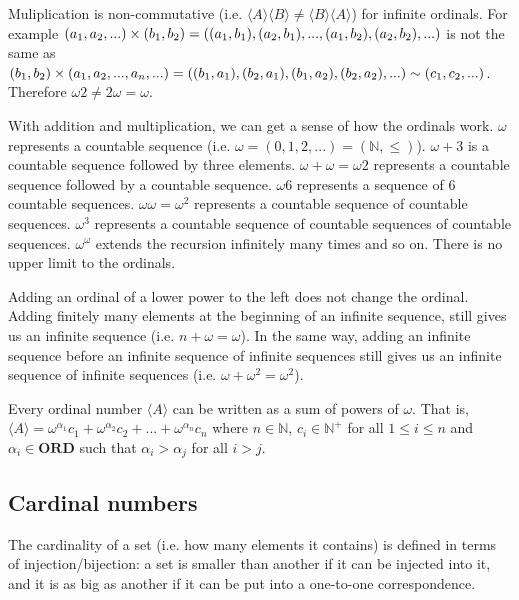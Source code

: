 \documentclass{article}
\def\ordinals{\textbf{ORD}}
\def\ordeq{\sim}
\begin{document}
\begin{remark}
	Muliplication is non-commutative (i.e. $\langle A \rangle \langle B \rangle \neq \langle B \rangle \langle A \rangle$) for infinite ordinals. For example $(a_1, a_2, ...) \times (b_1, b_2) = ((a_1, b_1), (a_2, b_1), ..., (a_1, b_2), (a_2, b_2), \\...)$ is not the same as $(b_1, b_2) \times (a_1, a_2, ..., a_n, ...) = ((b_1, a_1), (b_2, a_1), (b_1, a_2), \\ (b_2, a_2), ...) \ordeq (c_1, c_2, ...)$. Therefore $\omega 2 \neq 2 \omega = \omega$.
	
	With addition and multiplication, we can get a sense of how the ordinals work. $\omega$ represents a countable sequence (i.e. $\omega = (0, 1, 2, ...) = (\mathbb{N}, \leq)$). $\omega +3$ is a countable sequence followed by three elements. $\omega + \omega  = \omega2$ represents a countable sequence followed by a countable sequence. $\omega6$ represents a sequence of 6 countable sequences. $\omega\omega = \omega^2$ represents a countable sequence of countable sequences. $\omega^3$ represents a countable sequence of countable sequences of countable sequences. $\omega^\omega$ extends the recursion infinitely many times and so on. There is no upper limit to the ordinals.
	
	Adding an ordinal of a lower power to the left does not change the ordinal. Adding finitely many elements at the beginning of an infinite sequence, still gives us an infinite sequence (i.e. $n + \omega = \omega$). In the same way, adding an infinite sequence before an infinite sequence of infinite sequences still gives us an infinite sequence of infinite sequences (i.e. $\omega +\omega^2 = \omega^2$).
\end{remark}

\begin{prop}
	Every ordinal number $\langle A \rangle$ can be written as a sum of powers of $\omega$. That is, $\langle A \rangle = \omega^{\alpha_1} c_1 + \omega^{\alpha_2} c_2 + ... + \omega^{\alpha_n} c_n$ where $n \in \mathbb{N}$, $c_i \in \mathbb{N}^+$ for all $1 \leq i \leq n$ and $\alpha_i \in \ordinals$ such that $\alpha_i > \alpha_j$ for all $i > j$.
\end{prop}

\subsection{Cardinal numbers}

\begin{remark}
	The cardinality of a set (i.e. how many elements it contains) is defined in terms of injection/bijection: a set is smaller than another if it can be injected into it, and it is as big as another if it can be put into a one-to-one correspondence.
\end{remark}
\end{document}
